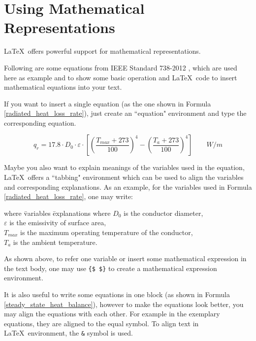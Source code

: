 \chapter{Using Mathematical Representations}

\LaTeX~offers powerful support for mathematical representations.

Following are some equations from IEEE Standard 738-2012 \cite{IEEEPower&EnergySociety.2013}, which are used here as example and to show some basic operation and \LaTeX~code to insert mathematical equations into your text. 

If you want to insert a single equation (as the one shown in Formula \ref{radiated_heat_loss_rate}), just create an ``equation" environment and type the corresponding equation.

\begin{equation}
	q_r = 17.8 {\cdot} D_0 {\cdot} {\varepsilon} {\cdot}\left[
	\left( \frac{T_{max}{+}273}{100} \right)^4 - \left( \frac{T_a{+}273}{100} \right)^4
	\right] \qquad W/m
	\label{radiated_heat_loss_rate}
\end{equation}

Maybe you also want to explain meanings of the variables used in the equation, \LaTeX~offers a ``tabbing" environment which can be used to align the variables and corresponding explanations. As an example, for the variables used in Formula \ref{radiated_heat_loss_rate}, one may write:

\begin{tabbing}
	where \hspace{0.3cm} \= variables  \= explanations \kill
	where \> {$D_0$} \> is the conductor diameter, \\
	\> {$\varepsilon$} \> is the emissivity of surface area, \\
	\> {$T_{max}$} \> is the maximum operating temperature of the conductor, \\
	\> {$T_a$} \> is the ambient temperature.
\end{tabbing}

As shown above, to refer one variable or insert some mathematical expression in the text body, one may use {\verb|{$ $}|} to create a mathematical expression environment.

It is also useful to write some equations in one block (as shown in Formula \ref{steady_state_heat_balance}), however to make the equations look better, you may align the equations with each other. For example in the exemplary equations, they are aligned to the equal symbol. To align text in \LaTeX~environment, the {\verb|&|} symbol is used.

